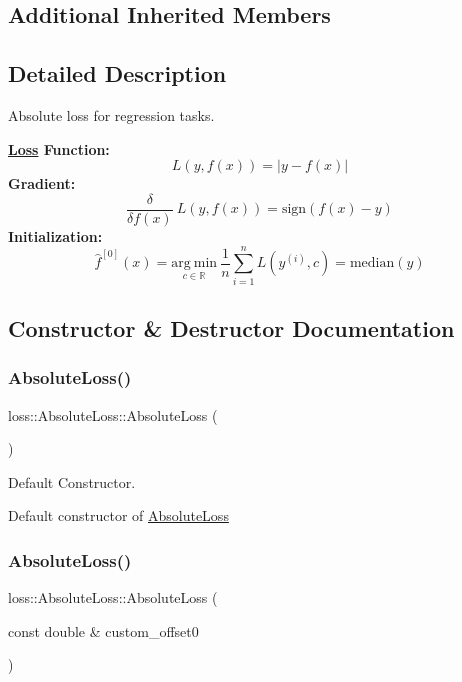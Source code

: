 \subsection*{Additional Inherited Members}


\subsection{Detailed Description}
Absolute loss for regression tasks. 

{\bfseries \mbox{\hyperlink{classloss_1_1_loss}{Loss}} Function\+:} \[ L(y, f(x)) = \left| y - f(x) \right| \] {\bfseries Gradient\+:} \[ \frac{\delta}{\delta f(x)}\ L(y, f(x)) = \mathrm{sign}\left( f(x) - y \right) \] {\bfseries Initialization\+:} \[ \hat{f}^{[0]}(x) = \underset{c\in\mathbb{R}}{\mathrm{arg~min}}\ \frac{1}{n}\sum\limits_{i=1}^n L\left(y^{(i)}, c\right) = \mathrm{median}(y) \] 

\subsection{Constructor \& Destructor Documentation}
\mbox{\label{classloss_1_1_absolute_loss_a4b1416147d0573079f9d652097c1ab81}} 
\subsubsection{\texorpdfstring{Absolute\+Loss()}{LossAbsolute()}\hspace{0.1cm}{\footnotesize\ttfamily [1/2]}}
{\footnotesize\ttfamily loss\+::\+Absolute\+Loss\+::\+Absolute\+Loss (\begin{DoxyParamCaption}{ }\end{DoxyParamCaption})}



Default Constructor. 

Default constructor of {\ttfamily \mbox{\hyperlink{classloss_1_1_absolute_loss}{Absolute\+Loss}}} \mbox{\label{classloss_1_1_absolute_loss_a3e056fbde0b63527bb9aadb0a4a8547a}} 
\subsubsection{\texorpdfstring{Absolute\+Loss()}{LossAbsolute()}\hspace{0.1cm}{\footnotesize\ttfamily [2/2]}}
{\footnotesize\ttfamily loss\+::\+Absolute\+Loss\+::\+Absolute\+Loss (\begin{DoxyParamCaption}\item[{const double \&}]{custom\+\_\+offset0 }\end{DoxyParamCaption})}



